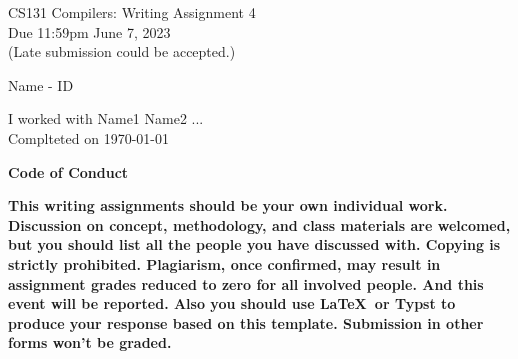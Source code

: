 \documentclass[10pt]{article}
\begin{document}
\begin{center}
	\Large CS131 Compilers: Writing Assignment 4\\Due 11:59pm June 7, 2023\\(Late submission could be accepted.)
\end{center}

\begin{center}
	\LARGE Name - ID
\end{center}

\begin{center}
	I worked with Name1 Name2 ...
	\small \\Complteted on \today
\end{center}

\begin{center}
	\large \textbf{Code of Conduct}    \\
\end{center}

\small \textbf{This writing assignments should be your own individual work. Discussion on concept, methodology, and class materials are welcomed, but you should list all the people you have discussed with. Copying is strictly prohibited. Plagiarism, once confirmed, may result in assignment grades reduced to zero for all involved people. And this event will be reported. Also you should use \LaTeX\ or Typst to produce your response based on this template. Submission in other forms won't be graded.}\\
\end{document}

